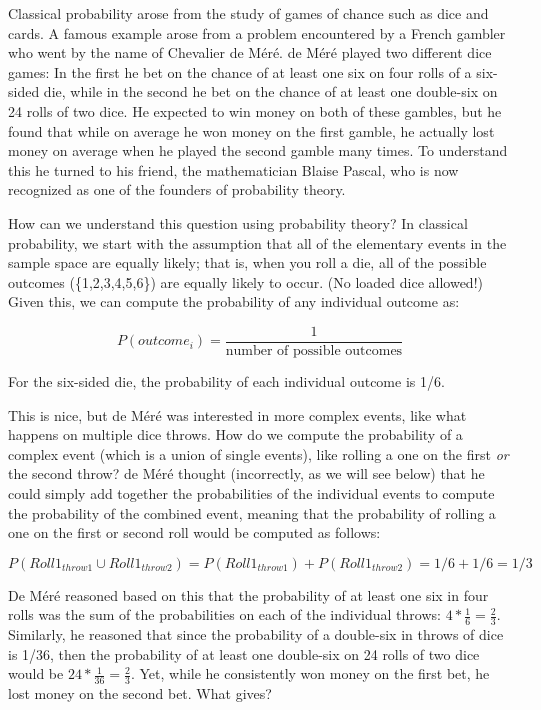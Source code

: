 \documentclass[]{book}
\theoremstyle{definition}
\theoremstyle{definition}
\theoremstyle{definition}
\theoremstyle{remark}
\begin{document}
Classical probability arose from the study of games of chance such as
dice and cards. A famous example arose from a problem encountered by a
French gambler who went by the name of Chevalier de Méré. de Méré played
two different dice games: In the first he bet on the chance of at least
one six on four rolls of a six-sided die, while in the second he bet on
the chance of at least one double-six on 24 rolls of two dice. He
expected to win money on both of these gambles, but he found that while
on average he won money on the first gamble, he actually lost money on
average when he played the second gamble many times. To understand this
he turned to his friend, the mathematician Blaise Pascal, who is now
recognized as one of the founders of probability theory.

How can we understand this question using probability theory? In
classical probability, we start with the assumption that all of the
elementary events in the sample space are equally likely; that is, when
you roll a die, all of the possible outcomes (\{1,2,3,4,5,6\}) are
equally likely to occur. (No loaded dice allowed!) Given this, we can
compute the probability of any individual outcome as:

\[
P(outcome_i) = \frac{1}{\text{number of possible outcomes}}
\]

For the six-sided die, the probability of each individual outcome is
1/6.

This is nice, but de Méré was interested in more complex events, like
what happens on multiple dice throws. How do we compute the probability
of a complex event (which is a union of single events), like rolling a
one on the first \emph{or} the second throw? de Méré thought
(incorrectly, as we will see below) that he could simply add together
the probabilities of the individual events to compute the probability of
the combined event, meaning that the probability of rolling a one on the
first or second roll would be computed as follows:

\[
P(Roll1_{throw1} \cup Roll1_{throw2}) = P(Roll1_{throw1}) + P(Roll1_{throw2}) = 1/6 + 1/6 = 1/3
\]

De Méré reasoned based on this that the probability of at least one six
in four rolls was the sum of the probabilities on each of the individual
throws: \(4*\frac{1}{6}=\frac{2}{3}\). Similarly, he reasoned that since
the probability of a double-six in throws of dice is 1/36, then the
probability of at least one double-six on 24 rolls of two dice would be
\(24*\frac{1}{36}=\frac{2}{3}\). Yet, while he consistently won money on
the first bet, he lost money on the second bet. What gives?
\end{document}
